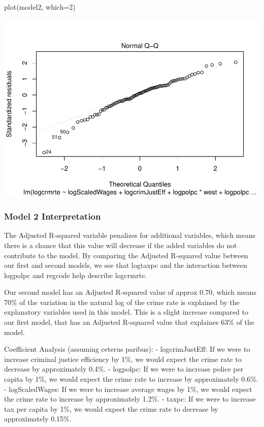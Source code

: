\documentclass[]{article}
\newenvironment{Shaded}{}{}
\newcommand{\DataTypeTok}[1]{#1}
\newcommand{\DecValTok}[1]{#1}
\newcommand{\KeywordTok}[1]{\textcolor[rgb]{0.00,0.00,1.00}{#1}}
\newcommand{\NormalTok}[1]{#1}
\begin{document}
\begin{Shaded}
\begin{Highlighting}[]
\KeywordTok{plot}\NormalTok{(model2, }\DataTypeTok{which=}\DecValTok{2}\NormalTok{)}
\end{Highlighting}
\end{Shaded}

\includegraphics{Bagnard_Gaustad_Hartman_Leung_Lab_3_files/figure-latex/unnamed-chunk-76-1.pdf}

\hypertarget{model-2-interpretation}{%
\subsubsection{Model 2 Interpretation}\label{model-2-interpretation}}

The Adjusted R-squared variable penalizes for additional variables,
which means there is a chance that this value will decrease if the added
variables do not contribute to the model. By comparing the Adjusted
R-squared value between our first and second models, we see that
logtaxpc and the interaction between logpolpc and regcode help describe
logcrmrte.

Our second model has an Adjusted R-squared value of approx 0.70, which
means 70\% of the variation in the natural log of the crime rate is
explained by the explanatory variables used in this model. This is a
slight increase compared to our first model, that has an Adjusted
R-squared value that explaines 63\% of the model.

Coefficient Analysis (assuming ceterus paribus): - logcrimJustEff: If we
were to increase criminal justice efficiency by 1\%, we would expect the
crime rate to decrease by approximately 0.4\%. - logpolpc: If we were to
increase police per capita by 1\%, we would expect the crime rate to
increase by approximately 0.6\%. - logScaledWages: If we were to
increase average wages by 1\%, we would expect the crime rate to
increase by approximately 1.2\%. - taxpc: If we were to increase tax per
capita by 1\%, we would expect the crime rate to decrease by
approximately 0.15\%.
\end{document}
